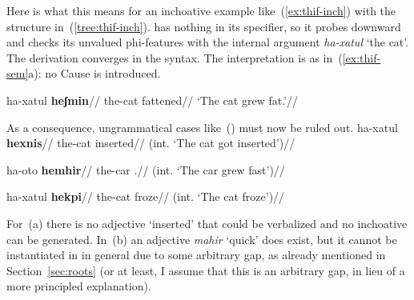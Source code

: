 Here is what this means for an inchoative example like~(\ref{ex:thif-inch}) with the structure in~(\ref{tree:thif-inch}). {\vd} has nothing in its specifier, so it probes downward and checks its unvalued phi-features with the internal argument \emph{ha-xatul} `the cat'. The derivation converges in the syntax. The interpretation is as in~(\ref{ex:thif-sem}a): no Cause is introduced.

\ex\label{ex:thif-inch} \begingl
	\gla ha-xatul \textbf{heʃmin}//
	\glb the-cat fattened//
	\glft `The cat grew fat.'//
	\endgl
\xe
	
	\ex\label{tree:thif-inch}
	\xe


As a consequence, ungrammatical cases like~(\nextx) must now be ruled out.
\pex\label{ex:counterex}
	\a \ljudge{*}
		\begingl
		\gla ha-xatul \textbf{hexnis}//
		\glb the-cat inserted//
		\glft (int. `The cat got inserted')//
	\endgl
	
	\a \ljudge{*}
		\begingl
		\gla ha-oto \textbf{hemhir}//
		\glb the-car .//
		\glft (int. `The car grew fast')//
	\endgl

	\a \ljudge{*}
		\begingl
		\gla ha-xatul \textbf{hekpi}//
		\glb the-cat froze//
		\glft (int. `The cat froze')//
	\endgl
\xe

For~(\lastx a) there is no adjective `inserted' that could be verbalized and no inchoative can be generated. In~(\lastx b) an adjective \emph{mahir} `quick' does exist, but it cannot be instantiated in {\thif} in general due to some arbitrary gap, as already mentioned in Section~\ref{sec:roots} (or at least, I assume that this is an arbitrary gap, in lieu of a more principled explanation).

